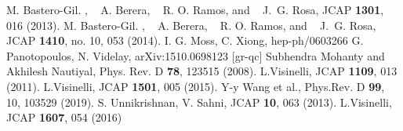 \documentclass[12pt]{revtex4}
\begin{document}
\begin{thebibliography}{99}
   M. Bastero-Gil. , ~ A. Berera, ~ R. O. Ramos, and ~ J.~G. Rosa,  JCAP  \textbf{1301}, 016 (2013).
   M. Bastero-Gil. , ~ A. Berera, ~ R. O. Ramos, and ~ J.~G. Rosa,  JCAP \textbf{1410}, no. 10, 053 (2014).
 I. G.  Moss,   C. Xiong, hep-ph/0603266
G. Panotopoulos,  N. Videlay, arXiv:1510.0698123 [gr-qc]
 {Subhendra Mohanty and Akhilesh Nautiyal, Phys. Rev. D\textbf{ 78}, 123515 (2008)}.
 {  L.Visinelli, 	JCAP\textbf{ 1109}, 013 (2011).}
 {  L.Visinelli, 	JCAP \textbf{1501}, 005 (2015).}
 {  Y-y Wang et al., Phys.Rev. D \textbf{99}, 10, 103529
(2019).}
  S. Unnikrishnan,  V. Sahni, JCAP \textbf{10}, 063 (2013).
 {  L.Visinelli, JCAP \textbf{1607}, 054 (2016)}

\end{thebibliography}
\end{document}
